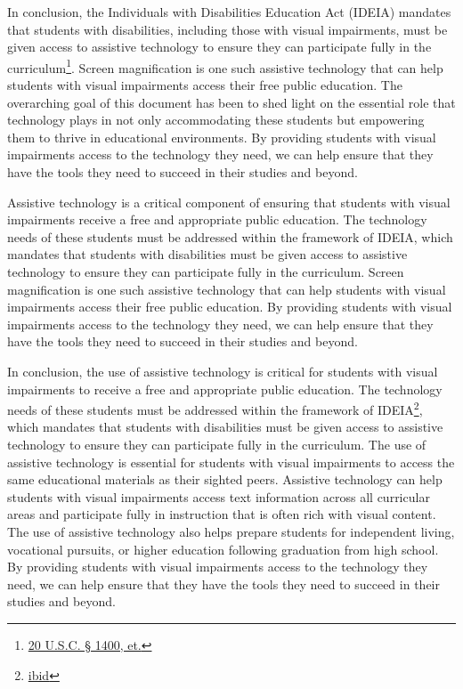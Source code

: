 \documentclass[14pt,letterpaper,twoside]{extreport}
\begin{document}
In conclusion, the Individuals with Disabilities Education Act (IDEIA) mandates that students with disabilities, including those with visual impairments, must be given access to assistive technology to ensure they can participate fully in the curriculum\footnote{\href{https://sites.ed.gov/idea/statuteregulations/}{20 U.S.C. § 1400, et.}}. Screen magnification is one such assistive technology that can help students with visual impairments access their free public education. The overarching goal of this document has been  to shed light on the essential role that technology plays in not only accommodating these students but empowering them to thrive in educational environments. By providing students with visual impairments access to the technology they need, we can help ensure that they have the tools they need to succeed in their studies and beyond.

Assistive technology is a critical component of ensuring that students with visual impairments receive a free and appropriate public education. The technology needs of these students must be addressed within the framework of IDEIA, which mandates that students with disabilities must be given access to assistive technology to ensure they can participate fully in the curriculum. Screen magnification is one such assistive technology that can help students with visual impairments access their free public education. By providing students with visual impairments access to the technology they need, we can help ensure that they have the tools they need to succeed in their studies and beyond.

In conclusion, the use of assistive technology is critical for students with visual impairments to receive a free and appropriate public education. The technology needs of these students must be addressed within the framework of IDEIA\footnote{\href{https://sites.ed.gov/idea/statuteregulations/}{ibid}}, which mandates that students with disabilities must be given access to assistive technology to ensure they can participate fully in the curriculum. The use of assistive technology is essential for students with visual impairments to access the same educational materials as their sighted peers. Assistive technology can help students with visual impairments access text information across all curricular areas and participate fully in instruction that is often rich with visual content. The use of assistive technology also helps prepare students for independent living, vocational pursuits, or higher education following graduation from high school. By providing students with visual impairments access to the technology they need, we can help ensure that they have the tools they need to succeed in their studies and beyond.
\end{document}
